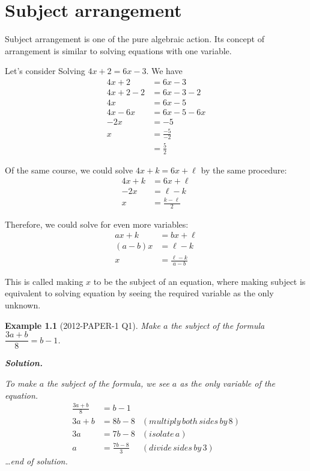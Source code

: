 \documentclass[12pt]{book}
\newtheorem*{example}{Example}
\newenvironment{solution}{\textbf{Solution.} \par}{\hfill \textit{\dots end of solution.}}
\begin{document}
    \chapter{Subject arrangement}

    Subject arrangement is one of the pure algebraic action. Its concept of arrangement is similar to solving equations with one variable.

    Let's consider Solving $4x+2=6x-3$. We have \begin{align*}
        4x+2&=6x-3\\
        4x+2-2&=6x-3-2\\
        4x&=6x-5\\
        4x-6x&=6x-5-6x\\
        -2x&=-5\\
        x&=\frac{-5}{-2}\\
        &=\frac{5}{2}
    \end{align*}

    Of the same course, we could solve $4x+k=6x+\ell$ by the same procedure:\begin{align*}
        4x+k&=6x+\ell\\
        -2x&=\ell-k\\
        x&=\frac{k-\ell}{2}
    \end{align*}

    Therefore, we could solve for even more variables:\begin{align*}
        ax+k&=bx+\ell\\
        (a-b)x&=\ell-k\\
        x&=\frac{\ell-k}{a-b}
    \end{align*}

    This is called making $x$ to be the subject of an equation, where making subject is equivalent to solving equation by seeing the required variable as the only unknown.

    \begin{example}[2012-PAPER-1 Q1]
        Make $a$ the subject of the formula $\dfrac{3a+b}{8}=b-1$.

        \begin{solution}
            To make $a$ the subject of the formula, we see $a$ as the only variable of the equation.\begin{align*}
                \frac{3a+b}{8}&=b-1\\
                3a+b&=8b-8&(multiply\, both\, sides\, by\, 8)\\
                3a&=7b-8&(isolate\, a)\\
                a&=\frac{7b-8}{3}&(divide\, sides\, by\, 3)
            \end{align*}
        \end{solution}
    \end{example}
\end{document}
